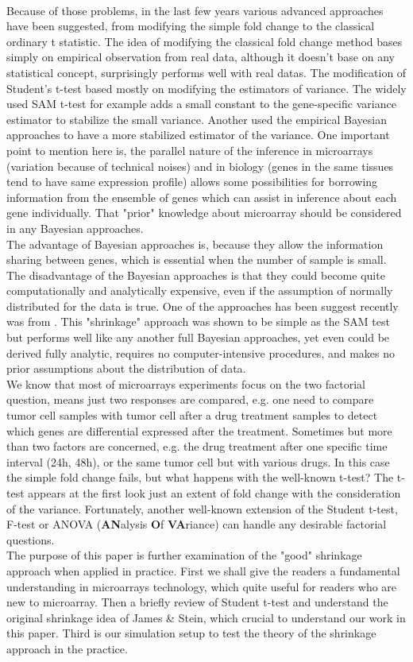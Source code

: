 \\
Because of those problems, in the last few years various advanced approaches have been suggested, from modifying the simple fold change to the classical ordinary t statistic. The idea of modifying the classical fold change method \citep{Kadota:2008p275} bases simply on empirical observation from real data, although it doesn't base on any statistical concept, surprisingly performs well with real datas. The modification of Student's t-test based mostly on modifying the estimators of variance. The widely used SAM t-test \citep{Tusher:2001p295} for example adds a small constant to the gene-specific variance estimator to stabilize the small variance. Another used the empirical Bayesian approaches to have a more stabilized estimator of the variance. One important point to mention here is, the parallel nature of the inference in microarrays (variation because of technical noises) and in biology (genes in the same tissues tend to have same expression profile) allows some possibilities for borrowing information from the ensemble of genes which can assist in inference about each gene individually. That "prior" knowledge about microarray should be considered in any Bayesian approaches.
\\
The advantage of Bayesian approaches is, because they allow the information sharing between genes, which is essential when the number of sample is small. The disadvantage of the Bayesian approaches is that they could become quite computationally and analytically expensive, even if the assumption of normally distributed for the data is true. One of the approaches has been suggest recently was from \citep{OpgenRhein:2007p11}. This "shrinkage" approach was shown to be simple as the SAM test but performs well like any another full Bayesian approaches, yet even could be derived fully analytic, requires no computer-intensive procedures, and makes no prior assumptions about the distribution of data.
\\
We know that most of microarrays experiments focus on the two factorial question, means just two responses are compared, e.g. one need to compare tumor cell samples with tumor cell after a drug treatment samples to detect which genes are differential expressed after the treatment. Sometimes but more than two factors are concerned, e.g. the drug treatment after one specific time interval (24h, 48h), or the same tumor cell but with various drugs. In this case the simple fold change fails, but what happens with the well-known t-test? The t-test appears at the first look just an extent of fold change with the consideration of the variance. Fortunately, another well-known extension of the Student t-test, F-test or ANOVA ({\bf AN}alysis {\bf O}f {\bf VA}riance) can handle any desirable factorial questions.
\\[1ex]
The purpose of this paper is further examination of the "good" shrinkage approach when applied in practice. First we shall give the readers a fundamental understanding in microarrays technology, which quite useful for readers who are new to microarray. Then a briefly review of Student t-test and understand the original shrinkage idea of James \& Stein, which crucial to understand our work in this paper. Third is our simulation setup to test the theory of the shrinkage approach in the practice.
